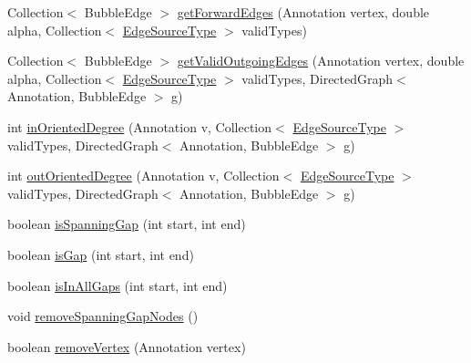 \begin{DoxyCompactItemize}
\item 
Collection$<$ Bubble\+Edge $>$ \hyperlink{classbroad_1_1pda_1_1seq_1_1graph_1_1_chromosome_with_bubbles_j_graph_t_afea269e94ab8a39ab2df12ff9d104062}{get\+Forward\+Edges} (Annotation vertex, double alpha, Collection$<$ \hyperlink{enumbroad_1_1pda_1_1seq_1_1graph_1_1_chromosome_with_bubbles_j_graph_t_1_1_edge_source_type}{Edge\+Source\+Type} $>$ valid\+Types)
\item 
Collection$<$ Bubble\+Edge $>$ \hyperlink{classbroad_1_1pda_1_1seq_1_1graph_1_1_chromosome_with_bubbles_j_graph_t_af2b3ad769c7da3c808548c2099d8e3a1}{get\+Valid\+Outgoing\+Edges} (Annotation vertex, double alpha, Collection$<$ \hyperlink{enumbroad_1_1pda_1_1seq_1_1graph_1_1_chromosome_with_bubbles_j_graph_t_1_1_edge_source_type}{Edge\+Source\+Type} $>$ valid\+Types, Directed\+Graph$<$ Annotation, Bubble\+Edge $>$ g)
\item 
int \hyperlink{classbroad_1_1pda_1_1seq_1_1graph_1_1_chromosome_with_bubbles_j_graph_t_a4d7680c735522fe96b8f19c6901d0d83}{in\+Oriented\+Degree} (Annotation v, Collection$<$ \hyperlink{enumbroad_1_1pda_1_1seq_1_1graph_1_1_chromosome_with_bubbles_j_graph_t_1_1_edge_source_type}{Edge\+Source\+Type} $>$ valid\+Types, Directed\+Graph$<$ Annotation, Bubble\+Edge $>$ g)
\item 
int \hyperlink{classbroad_1_1pda_1_1seq_1_1graph_1_1_chromosome_with_bubbles_j_graph_t_ae00bb732a630891f7bd8586589de0c26}{out\+Oriented\+Degree} (Annotation v, Collection$<$ \hyperlink{enumbroad_1_1pda_1_1seq_1_1graph_1_1_chromosome_with_bubbles_j_graph_t_1_1_edge_source_type}{Edge\+Source\+Type} $>$ valid\+Types, Directed\+Graph$<$ Annotation, Bubble\+Edge $>$ g)
\item 
boolean \hyperlink{classbroad_1_1pda_1_1seq_1_1graph_1_1_chromosome_with_bubbles_j_graph_t_ac8a3ce5c61ee9ab7759b97b809b9099f}{is\+Spanning\+Gap} (int start, int end)
\item 
boolean \hyperlink{classbroad_1_1pda_1_1seq_1_1graph_1_1_chromosome_with_bubbles_j_graph_t_ab0d12e3df82e16fecdf3fa3a15f1988d}{is\+Gap} (int start, int end)
\item 
boolean \hyperlink{classbroad_1_1pda_1_1seq_1_1graph_1_1_chromosome_with_bubbles_j_graph_t_a328f7944789466e63a8f6816409bcd41}{is\+In\+All\+Gaps} (int start, int end)
\item 
void \hyperlink{classbroad_1_1pda_1_1seq_1_1graph_1_1_chromosome_with_bubbles_j_graph_t_a29adad576953ed36d106f54f79020aa8}{remove\+Spanning\+Gap\+Nodes} ()
\item 
boolean \hyperlink{classbroad_1_1pda_1_1seq_1_1graph_1_1_chromosome_with_bubbles_j_graph_t_aab3c4ae39a708c76a0fb942f17b125cb}{remove\+Vertex} (Annotation vertex)

\end{DoxyCompactItemize}
